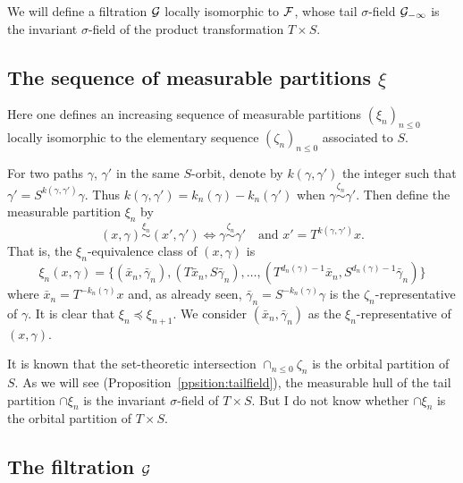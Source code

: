 \documentclass[12pt,a4paper]{article}
\begin{document}
We will define a filtration $\mathcal{G}$ locally isomorphic to $\mathcal{F}$, whose 
tail $\sigma$-field $\mathcal{G}_{-\infty}$ is the invariant $\sigma$-field of 
the product transformation $T \times S$. 


\subsection{The sequence of measurable partitions $\xi$}

Here one defines an increasing sequence of measurable partitions ${(\xi_n)}_{n \leq 0}$ 
locally isomorphic to the elementary sequence ${(\zeta_n)}_{n \leq 0}$ associated to $S$. 

For two paths $\gamma$, $\gamma'$ in the same $S$-orbit, denote by $k(\gamma,\gamma')$ 
the integer such that $\gamma'=S^{k(\gamma,\gamma')}\gamma$. 
Thus $k(\gamma,\gamma') = k_n(\gamma)-k_n(\gamma')$ when $\gamma \overset{\zeta_n}{\sim} \gamma'$. 
Then define the measurable partition $\xi_n$ by 
$$
\boxed{(x, \gamma) \overset{\xi_n}{\sim} (x', \gamma') \iff 
\gamma \overset{\zeta_n}{\sim} \gamma' \quad 
\text{and $x'=T^{k(\gamma,\gamma')}x$}}. 
$$
That is, the $\xi_n$-equivalence class of $(x,\gamma)$ is 
$$
\boxed{\xi_n(x,\gamma) = \bigl\{(\bar x_n, \bar\gamma_n), (T\bar x_n, S\bar\gamma_n), 
\ldots, (T^{d_n(\gamma)-1}\bar x_n, S^{d_n(\gamma)-1}\bar\gamma_n) \bigr\}}
$$
where $\bar x_n = T^{-k_n(\gamma)}x$ and, as already seen, 
$\bar\gamma_n = S^{-k_n(\gamma)}\gamma$ is the $\zeta_n$-representative of 
$\gamma$. 
It is clear that $\xi_n \preceq \xi_{n+1}$. 
We  consider $(\bar x_n, \bar\gamma_n)$ as the $\xi_n$-representative of
$(x,\gamma)$. 

\begin{remark}
It is known that the set-theoretic intersection 
$\cap_{n \leq 0} \zeta_n$ is the orbital partition of $S$. 
As we will see (Proposition~\ref{ppsition:tailfield}), 
the measurable hull of the tail partition $\cap \xi_n$ is 
the invariant $\sigma$-field of $T \times S$. 
But I do not know whether $\cap \xi_n$ 
is the orbital partition of $T \times S$.
\end{remark}

\subsection{The filtration $\mathcal{G}$} 
\end{document}
